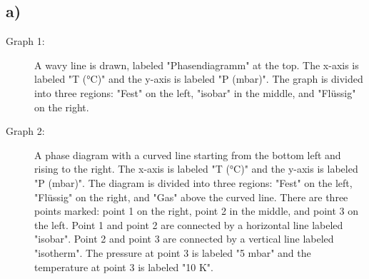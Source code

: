 

\subsection*{a)}

\begin{description}
    \item[Graph 1:] A wavy line is drawn, labeled "Phasendiagramm" at the top. The x-axis is labeled "T (°C)" and the y-axis is labeled "P (mbar)". The graph is divided into three regions: "Fest" on the left, "isobar" in the middle, and "Flüssig" on the right.
    \item[Graph 2:] A phase diagram with a curved line starting from the bottom left and rising to the right. The x-axis is labeled "T (°C)" and the y-axis is labeled "P (mbar)". The diagram is divided into three regions: "Fest" on the left, "Flüssig" on the right, and "Gas" above the curved line. There are three points marked: point 1 on the right, point 2 in the middle, and point 3 on the left. Point 1 and point 2 are connected by a horizontal line labeled "isobar". Point 2 and point 3 are connected by a vertical line labeled "isotherm". The pressure at point 3 is labeled "5 mbar" and the temperature at point 3 is labeled "10 K".
\end{description}